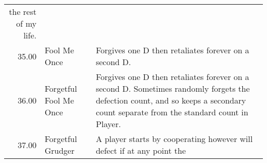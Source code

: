 \begin{table}[!hbtp]
\begin{adjustbox}{width=2\textwidth, angle=90}
\begin{tabular}{rll}
	the rest of my life.                                                                                                                                                                                                                                                                                                                                                                                                                                                                                                                                                                                                                                                                                                                                                                                                                                                                                                                        \\
	35.00  & Fool Me Once                & Forgives one D then retaliates forever on a second D.                                                                             \\
	36.00  & Forgetful Fool Me Once      & Forgives one D then retaliates forever on a second D. Sometimes randomly
	forgets the defection count, and so keeps a secondary count separate from
	the standard count in Player.                                                                                                                                                                                                                                                                                                                                                                                                                                                                                                                                                                                                                                                                                                                                                                                                                                 \\
	37.00  & Forgetful Grudger           & A player starts by cooperating however will defect if at any point the

\end{tabular}
\end{adjustbox}
\end{table}
